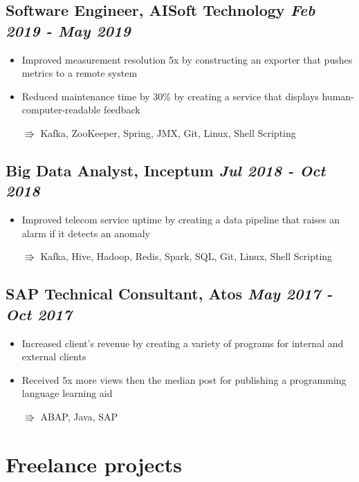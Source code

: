 \documentclass[a4paper]{article}
\newcommand{\bolditalicpair}
[2]
{\textbf{#1} \texorpdfstring{\hfill}{} \textit{#2}}
\begin{document}
\subsection{\bolditalicpair{Software Engineer, AISoft Technology}{Feb 2019 - May 2019}}

\begin{itemize}
  \item Improved measurement resolution 5x by constructing an exporter that pushes metrics to a remote system
  \item Reduced maintenance time by 30\% by creating a service that displays human-computer-readable feedback
  \item[$\Rrightarrow$] Kafka, ZooKeeper, Spring, JMX, Git, Linux, Shell Scripting
\end{itemize}

\subsection{\bolditalicpair{Big Data Analyst, Inceptum}{Jul 2018 - Oct 2018}}

\begin{itemize}
  \item Improved telecom service uptime by creating a data pipeline that raises an alarm if it detects an anomaly
  \item[$\Rrightarrow$] Kafka, Hive, Hadoop, Redis, Spark, SQL, Git, Linux, Shell Scripting
\end{itemize}

\subsection{\bolditalicpair{SAP Technical Consultant, Atos}{May 2017 - Oct 2017}}

\begin{itemize}
  \item Increased client's revenue by creating a variety of programs for internal and external clients
  \item Received 5x more views then the median post for publishing a programming language learning aid
  \item[$\Rrightarrow$] ABAP, Java, SAP
\end{itemize}



\section{Freelance projects}
\end{document}
